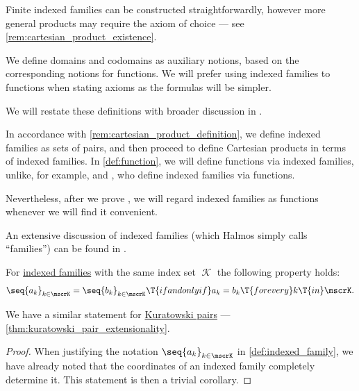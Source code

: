 \begin{comments}
  \item Finite indexed families can be constructed straightforwardly, however more general products may require the axiom of choice --- see \cref{rem:cartesian_product_existence}.

  \item We define domains and codomains as auxiliary notions, based on the corresponding notions for functions. We will prefer using indexed families to functions when stating axioms as the formulas will be simpler.

  We will restate these definitions with broader discussion in .

  \item In accordance with \cref{rem:cartesian_product_definition}, we define indexed families as sets of pairs, and then proceed to define Cartesian products in terms of indexed families. In \cref{def:function}, we will define functions via indexed families, unlike, for example, \textcite[ch. 9]{Halmos1960NaiveSetTheory} and \textcite[2]{Engelking1989GeneralTopology}, who define indexed families via functions.

  Nevertheless, after we prove , we will regard indexed families as functions whenever we will find it convenient.

  An extensive discussion of indexed families (which Halmos simply calls \enquote{families}) can be found in \cite[ch. 9]{Halmos1960NaiveSetTheory}.
\end{comments}

\begin{proposition}\label{thm:indexed_family_extensionality}
  For \hyperref[def:indexed_family]{indexed families} with the same index set \( \mscrK \) the following property holds:
  \begin{equation*}
    \seq{ a_k }_{k \in \mscrK} = \seq{ b_k }_{k \in \mscrK} \T{if and only if} a_k = b_k \T{for every} k \T{in} \mscrK.
  \end{equation*}
\end{proposition}
\begin{comments}
  \item We have a similar statement for \hyperref[def:kuratowski_pair]{Kuratowski pairs} --- \cref{thm:kuratowski_pair_extensionality}.
\end{comments}
\begin{proof}
  When justifying the notation \( \seq{ a_k }_{k \in \mscrK} \) in \cref{def:indexed_family}, we have already noted that the coordinates of an indexed family completely determine it. This statement is then a trivial corollary.
\end{proof}

